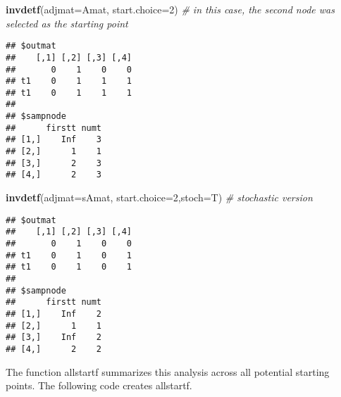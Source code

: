 \documentclass[]{article}
\newenvironment{Shaded}{\begin{snugshade}}{\end{snugshade}}
\newcommand{\KeywordTok}[1]{\textcolor[rgb]{0.13,0.29,0.53}{\textbf{#1}}}
\newcommand{\DataTypeTok}[1]{\textcolor[rgb]{0.13,0.29,0.53}{#1}}
\newcommand{\DecValTok}[1]{\textcolor[rgb]{0.00,0.00,0.81}{#1}}
\newcommand{\StringTok}[1]{\textcolor[rgb]{0.31,0.60,0.02}{#1}}
\newcommand{\CommentTok}[1]{\textcolor[rgb]{0.56,0.35,0.01}{\textit{#1}}}
\newcommand{\ControlFlowTok}[1]{\textcolor[rgb]{0.13,0.29,0.53}{\textbf{#1}}}
\newcommand{\OperatorTok}[1]{\textcolor[rgb]{0.81,0.36,0.00}{\textbf{#1}}}
\newcommand{\NormalTok}[1]{#1}
\begin{document}
\begin{Shaded}
\begin{Highlighting}[]
\KeywordTok{invdetf}\NormalTok{(}\DataTypeTok{adjmat=}\NormalTok{Amat, }\DataTypeTok{start.choice=}\DecValTok{2}\NormalTok{) }\CommentTok{# in this case, the second node was selected as the starting point}
\end{Highlighting}
\end{Shaded}

\begin{verbatim}
## $outmat
##    [,1] [,2] [,3] [,4]
##       0    1    0    0
## t1    0    1    1    1
## t1    0    1    1    1
## 
## $sampnode
##      firstt numt
## [1,]    Inf    3
## [2,]      1    1
## [3,]      2    3
## [4,]      2    3
\end{verbatim}

\begin{Shaded}
\begin{Highlighting}[]
\KeywordTok{invdetf}\NormalTok{(}\DataTypeTok{adjmat=}\NormalTok{sAmat, }\DataTypeTok{start.choice=}\DecValTok{2}\NormalTok{,}\DataTypeTok{stoch=}\NormalTok{T) }\CommentTok{# stochastic version}
\end{Highlighting}
\end{Shaded}

\begin{verbatim}
## $outmat
##    [,1] [,2] [,3] [,4]
##       0    1    0    0
## t1    0    1    0    1
## t1    0    1    0    1
## 
## $sampnode
##      firstt numt
## [1,]    Inf    2
## [2,]      1    1
## [3,]    Inf    2
## [4,]      2    2
\end{verbatim}

The function allstartf summarizes this analysis across all potential
starting points. The following code creates allstartf.

\begin{Shaded}
\end{Shaded}
\end{document}
